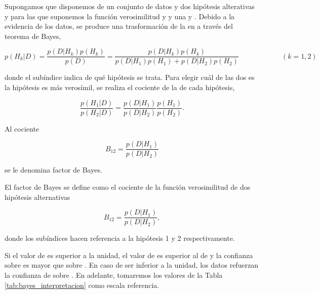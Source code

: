 Supongamos que disponemos de un conjunto de datos  y dos hipótesis alterativas  y  para las que suponemos la función verosimilitud  y  y una   y . Debido a la evidencia de los datos, se produce una trasformación de la  en   a través del teorema de Bayes,

\begin{equation*}
    p(H_{k}|D)=\frac{p(D|H_{k})p(H_{k})}{p(D)}=\frac{p(D|H_{k})p(H_{k})}{p(D|H_{1})p(H_1)+p(D|H_2)p(H_2)}\qquad \qquad \qquad (k=1,2)
\end{equation*}

donde el subíndice  indica de qué hipótesis se trata. Para elegir cuál de las dos es la hipótesis es más verosímil, se realiza el cociente de la  de cada hipótesis,

\begin{equation*}
   \frac{p(H_{1}|D)}{p(H_2|D)}=\frac{p(D|H_{1})}{p(D|H_2)}\frac{p(H_{1})}{p(H_2)}.
\end{equation*}

Al cociente

\begin{equation*}
    B_{12}=\frac{p(D|H_1)}{p(D|H_2)}
\end{equation*}

se le denomina factor de Bayes.

\begin{definition}\label{def:factor_bayes}
El factor de Bayes se define como el cociente de la función verosimilitud de dos hipótesis alternativas

\begin{equation}\label{eq:factor_bayes}
    B_{12}=\frac{p(D|H_1)}{p(D|H_2)},
\end{equation}

donde los subíndices hacen referencia a la hipótesis 1 y 2 respectivamente.
\end{definition}


Si el valor de  es superior a la unidad, el valor de  es superior al de  y la confianza sobre  es mayor que sobre . En caso de ser inferior a la unidad, los datos refuerzan la confianza de  sobre . En adelante, tomaremos los valores de la Tabla \ref{tab:bayes_interpretacion} como escala referencia.


